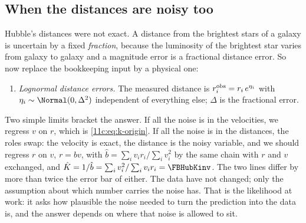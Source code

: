 \subsection{When the distances are noisy too}
\label{11c:sec:hubble-errors}

Hubble's distances were not exact. A distance from the brightest stars of a galaxy
is uncertain by a fixed \emph{fraction}, because the luminosity of the brightest
star varies from galaxy to galaxy and a magnitude error is a fractional distance
error. So now replace the bookkeeping input by a physical one:

\begin{enumerate}[label=(H\arabic*),leftmargin=2.6em,itemsep=1pt,start=4]
  \item \emph{Lognormal distance errors.} The measured distance is
        $r_i^{\rm obs}=r_i\,e^{\eta_i}$ with $\eta_i\sim\Normal(0,\Delta^2)$
        independent of everything else; $\Delta$ is the fractional error.
\end{enumerate}

Two simple limits bracket the answer. If all the noise is in the velocities, we
regress $v$ on $r$, which is \eqref{11c:eq:k-origin}. If all the noise is in the
distances, the roles swap: the velocity is exact, the distance is the noisy
variable, and we should regress $r$ on $v$, $r=bv$, with
$\hat b=\sum_iv_ir_i/\sum_iv_i^2$ by the same chain with $r$ and $v$ exchanged, and
$\hat K=1/\hat b=\sum_iv_i^2/\sum_iv_ir_i=\FBHubKinv$. The two lines differ by more
than twice the error bar of either. The data have not changed; only the assumption
about which number carries the noise has. That is the likelihood at work: it asks
how plausible the noise needed to turn the prediction into the data is, and the
answer depends on where that noise is allowed to sit.

